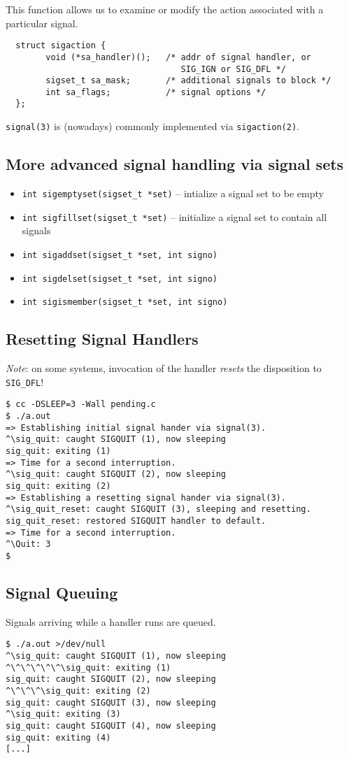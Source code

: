 \documentclass[xga]{xdvislides}
\begin{document}
This function allows us to examine or modify the action associated with a
particular signal.
\\

\begin{verbatim}
  struct sigaction {
        void (*sa_handler)();   /* addr of signal handler, or
                                   SIG_IGN or SIG_DFL */
        sigset_t sa_mask;       /* additional signals to block */
        int sa_flags;           /* signal options */
  };
\end{verbatim}

{\tt signal(3)} is (nowadays) commonly implemented via {\tt sigaction(2)}.

\subsection{More advanced signal handling via signal sets}
\begin{itemize}
	\item {\tt int sigemptyset(sigset\_t *set)} -- intialize a signal set to be empty
	\item {\tt int sigfillset(sigset\_t *set)} -- initialize a signal set to contain all signals
	\item {\tt int sigaddset(sigset\_t *set, int signo)}
	\item {\tt int sigdelset(sigset\_t *set, int signo)}
	\item {\tt int sigismember(sigset\_t *set, int signo)}
\end{itemize}

\subsection{Resetting Signal Handlers}
{\em Note}: on some systems, invocation of the handler {\em resets} the
disposition to {\tt SIG\_DFL}!

\begin{verbatim}
$ cc -DSLEEP=3 -Wall pending.c
$ ./a.out
=> Establishing initial signal hander via signal(3).
^\sig_quit: caught SIGQUIT (1), now sleeping
sig_quit: exiting (1)
=> Time for a second interruption.
^\sig_quit: caught SIGQUIT (2), now sleeping
sig_quit: exiting (2)
=> Establishing a resetting signal hander via signal(3).
^\sig_quit_reset: caught SIGQUIT (3), sleeping and resetting.
sig_quit_reset: restored SIGQUIT handler to default.
=> Time for a second interruption.
^\Quit: 3
$
\end{verbatim}

\subsection{Signal Queuing}
Signals arriving while a handler runs are queued.
\begin{verbatim}
$ ./a.out >/dev/null
^\sig_quit: caught SIGQUIT (1), now sleeping
^\^\^\^\^\^\sig_quit: exiting (1)
sig_quit: caught SIGQUIT (2), now sleeping
^\^\^\^\sig_quit: exiting (2)
sig_quit: caught SIGQUIT (3), now sleeping
^\sig_quit: exiting (3)
sig_quit: caught SIGQUIT (4), now sleeping
sig_quit: exiting (4)
[...]
\end{verbatim}
\end{document}
